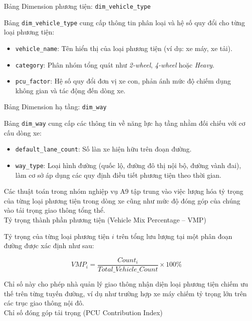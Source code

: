 Bảng Dimension phương tiện: \texttt{dim\_vehicle\_type}

Bảng \texttt{dim\_vehicle\_type} cung cấp thông tin phân loại và hệ số quy đổi cho từng loại phương tiện:

\begin{itemize}
    \item \texttt{vehicle\_name}: Tên hiển thị của loại phương tiện (ví dụ: xe máy, xe tải).
    \item \texttt{category}: Phân nhóm tổng quát như \textit{2-wheel}, \textit{4-wheel} hoặc \textit{Heavy}.
    \item \texttt{pcu\_factor}: Hệ số quy đổi đơn vị xe con, phản ánh mức độ chiếm dụng không gian và tác động đến dòng xe.
\end{itemize}

Bảng Dimension hạ tầng: \texttt{dim\_way}

Bảng \texttt{dim\_way} cung cấp các thông tin về năng lực hạ tầng nhằm đối chiếu với cơ cấu dòng xe:

\begin{itemize}
    \item \texttt{default\_lane\_count}: Số làn xe hiện hữu trên đoạn đường.
    \item \texttt{way\_type}: Loại hình đường (quốc lộ, đường đô thị nội bộ, đường vành đai), làm cơ sở áp dụng các quy định điều tiết phương tiện theo thời gian.
\end{itemize}


Các thuật toán trong nhóm nghiệp vụ A9 tập trung vào việc lượng hóa tỷ trọng của từng loại phương tiện trong dòng xe cũng như mức độ đóng góp của chúng vào tải trọng giao thông tổng thể.\\

Tỷ trọng thành phần phương tiện (Vehicle Mix Percentage -- VMP)

Tỷ trọng của từng loại phương tiện $i$ trên tổng lưu lượng tại một phân đoạn đường được xác định như sau:

\[
VMP_i = \frac{Count_i}{Total\_Vehicle\_Count} \times 100\%
\]

Chỉ số này cho phép nhà quản lý giao thông nhận diện loại phương tiện chiếm ưu thế trên từng tuyến đường, ví dụ như trường hợp xe máy chiếm tỷ trọng lớn trên các trục giao thông nội đô.\\

Chỉ số đóng góp tải trọng (PCU Contribution Index)

